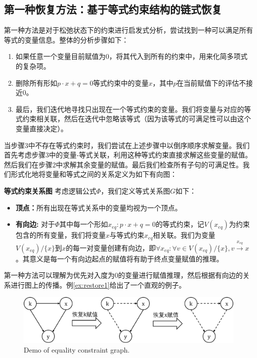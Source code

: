 \subsection{第一种恢复方法：基于等式约束结构的链式恢复}
第一种方法是对于松弛状态下的约束进行启发式分析，尝试找到一种可以满足所有等式的变量信息。整体的分析步骤如下：
\begin{enumerate}
    \item 如果任意一个变量目前赋值为0，将其代入到所有的约束中，用来化简多项式的复杂项。
    \item 删除所有形如$p \cdot x + q = 0$等式约束中的变量$x$，其中$p$在当前赋值下的评估不接近0。
    \item 最后，我们迭代地寻找只出现在一个等式约束的变量。我们将变量与对应的等式约束相关联，然后在迭代中忽略该等式（因为该等式的可满足性可以由这个变量直接决定）。
\end{enumerate}
当步骤3中不存在等式约束时，我们尝试在上述步骤中以倒序顺序求解变量。我们首先考虑步骤3中的变量-等式关联，利用这种等式约束直接求解这些变量的赋值。然后我们在步骤2中求解其余变量的赋值。最后我们检查所有子句的可满足性。我们形式化地将变量和等式之间的关系定义为如下有向图：
\begin{definition}{\textbf{等式约束关系图}}
考虑逻辑公式$\Phi$，我们定义等式关系图$G$如下：
\begin{itemize}
    \item \textbf{顶点：}所有出现在等式关系中的变量均视为一个顶点。
    \item \textbf{有向边:} 对于$\Phi$其中每一个形如$x_{eq}: p \cdot x + q = 0$的等式约束，记$V(x_{eq})$为约束包含的所有变量，我们将变量$x$与等式约束$x_{eq}$相关联。我们为变量$V(x_{eq}) / \{x\}$到$x$的每一对变量创建有向边，即$\forall x_{eq}: \forall v \in V(x_{eq}) / \{x\}, v \xrightarrow{x_{eq}} x$。其意义是每一个有向边起点的赋值将有助于终点变量赋值的推理。
\end{itemize}
\end{definition}

第一种方法可以理解为优先对入度为0的变量进行赋值推理，然后根据有向边的关系进行图上的传播。例\ref{ex:restore1}给出了一个直观的例子。

\begin{figure}[t]
    \centering
    \includegraphics[width=\columnwidth]{Img/restore1.png}
     {Demo of equality constraint graph.}
\label{fig:restore1}
\end{figure}


